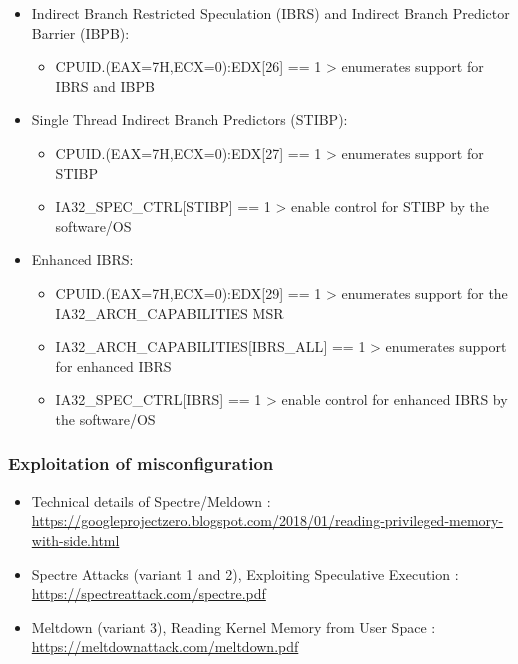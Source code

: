 \begin{itemize}
\tightlist
\item
  Indirect Branch Restricted Speculation (IBRS) and Indirect Branch
  Predictor Barrier (IBPB):

  \begin{itemize}
  \tightlist
  \item
    CPUID.(EAX=7H,ECX=0):EDX{[}26{]} == 1 \textgreater{} enumerates
    support for IBRS and IBPB
  \end{itemize}
\item
  Single Thread Indirect Branch Predictors (STIBP):

  \begin{itemize}
  \tightlist
  \item
    CPUID.(EAX=7H,ECX=0):EDX{[}27{]} == 1 \textgreater{} enumerates
    support for STIBP
  \item
    IA32\_SPEC\_CTRL{[}STIBP{]} == 1 \textgreater{} enable control for
    STIBP by the software/OS
  \end{itemize}
\item
  Enhanced IBRS:

  \begin{itemize}
  \tightlist
  \item
    CPUID.(EAX=7H,ECX=0):EDX{[}29{]} == 1 \textgreater{} enumerates
    support for the IA32\_ARCH\_CAPABILITIES MSR
  \item
    IA32\_ARCH\_CAPABILITIES{[}IBRS\_ALL{]} == 1 \textgreater{}
    enumerates support for enhanced IBRS
  \item
    IA32\_SPEC\_CTRL{[}IBRS{]} == 1 \textgreater{} enable control for
    enhanced IBRS by the software/OS
  \end{itemize}
\end{itemize}

\hypertarget{exploitation-of-misconfiguration-4}{%
\subsubsection{Exploitation of
misconfiguration}\label{exploitation-of-misconfiguration-4}}

\begin{itemize}
\tightlist
\item
  Technical details of Spectre/Meldown :
  \url{https://googleprojectzero.blogspot.com/2018/01/reading-privileged-memory-with-side.html}
\item
  Spectre Attacks (variant 1 and 2), Exploiting Speculative Execution :
  \url{https://spectreattack.com/spectre.pdf}
\item
  Meltdown (variant 3), Reading Kernel Memory from User Space :
  \url{https://meltdownattack.com/meltdown.pdf}
\end{itemize}

